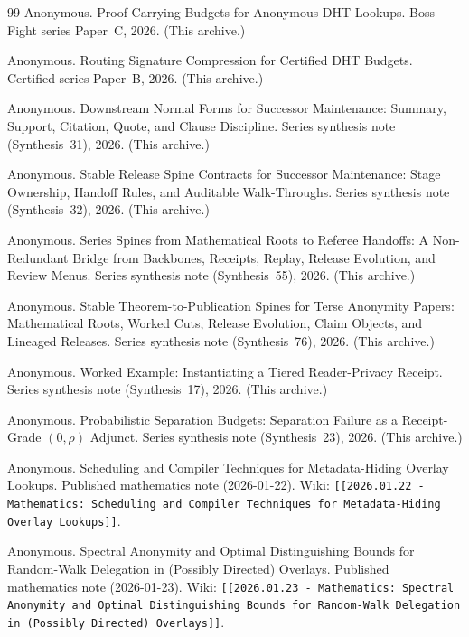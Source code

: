\documentclass[11pt]{article}
\begin{document}
\begin{thebibliography}{99}
Anonymous.
\newblock Proof-Carrying Budgets for Anonymous DHT Lookups.
\newblock Boss Fight series Paper~C, 2026. (This archive.)

Anonymous.
\newblock Routing Signature Compression for Certified DHT Budgets.
\newblock Certified series Paper~B, 2026. (This archive.)

Anonymous.
\newblock Downstream Normal Forms for Successor Maintenance: Summary, Support, Citation, Quote, and Clause Discipline.
\newblock Series synthesis note (Synthesis~31), 2026. (This archive.)

Anonymous.
\newblock Stable Release Spine Contracts for Successor Maintenance: Stage Ownership, Handoff Rules, and Auditable Walk-Throughs.
\newblock Series synthesis note (Synthesis~32), 2026. (This archive.)

Anonymous.
\newblock Series Spines from Mathematical Roots to Referee Handoffs: A Non-Redundant Bridge from Backbones, Receipts, Replay, Release Evolution, and Review Menus.
\newblock Series synthesis note (Synthesis~55), 2026. (This archive.)

Anonymous.
\newblock Stable Theorem-to-Publication Spines for Terse Anonymity Papers: Mathematical Roots, Worked Cuts, Release Evolution, Claim Objects, and Lineaged Releases.
\newblock Series synthesis note (Synthesis~76), 2026. (This archive.)

Anonymous.
\newblock Worked Example: Instantiating a Tiered Reader-Privacy Receipt.
\newblock Series synthesis note (Synthesis~17), 2026. (This archive.)

Anonymous.
\newblock Probabilistic Separation Budgets: Separation Failure as a Receipt-Grade $(0,\rho)$ Adjunct.
\newblock Series synthesis note (Synthesis~23), 2026. (This archive.)

Anonymous.
\newblock Scheduling and Compiler Techniques for Metadata-Hiding Overlay Lookups.
\newblock Published mathematics note (2026-01-22). Wiki: \texttt{[[2026.01.22 - Mathematics: Scheduling and Compiler Techniques for Metadata-Hiding Overlay Lookups]]}.

Anonymous.
\newblock Spectral Anonymity and Optimal Distinguishing Bounds for Random-Walk Delegation in (Possibly Directed) Overlays.
\newblock Published mathematics note (2026-01-23). Wiki: \texttt{[[2026.01.23 - Mathematics: Spectral Anonymity and Optimal Distinguishing Bounds for Random-Walk Delegation in (Possibly Directed) Overlays]]}.


\end{thebibliography}
\end{document}
